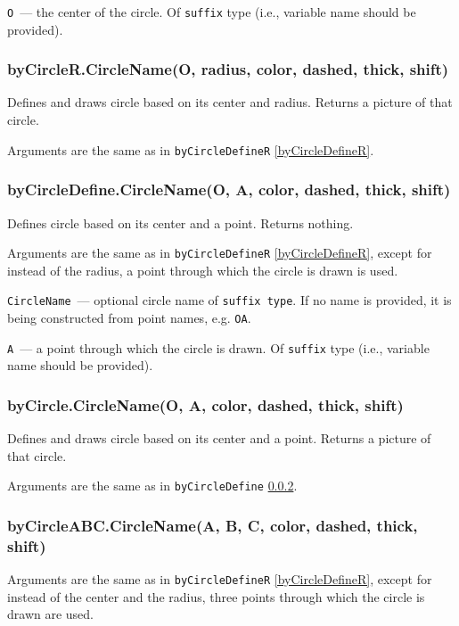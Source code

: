 	\texttt{O}~— the center of the circle. Of \texttt{suffix} type (i.e., variable name should be provided).

\subsubsection{byCircleR.CircleName(O, radius, color, dashed, thick, shift)}\label{byCircleR}
	
	Defines and draws circle based on its center and radius. Returns a picture of that circle.
	
	Arguments are the same as in \texttt{byCircleDefineR} \ref{byCircleDefineR}.

\subsubsection{byCircleDefine.CircleName(O, A, color, dashed, thick, shift)}\label{byCircleDefine}
	
	Defines circle based on its center and a point. Returns nothing.
	
	Arguments are the same as in \texttt{byCircleDefineR} \ref{byCircleDefineR}, except for instead of the radius, a point through which the circle is drawn is used.
	
	\texttt{CircleName}~— optional circle name of \texttt{suffix type}. If no name is provided, it is being constructed from point names, e.g. \texttt{OA}.
	
	\texttt{A}~— a point through which the circle is drawn. Of \texttt{suffix} type (i.e., variable name should be provided).

\subsubsection{byCircle.CircleName(O, A, color, dashed, thick, shift)}\label{byCircle}
	
	Defines and draws circle based on its center and a point. Returns a picture of that circle.
	
	Arguments are the same as in \texttt{byCircleDefine} \ref{byCircleDefine}.

\subsubsection{byCircleABC.CircleName(A, B, C, color, dashed, thick, shift)}\label{byCircleABC}
	
	Arguments are the same as in \texttt{byCircleDefineR} \ref{byCircleDefineR}, except for instead of the center and the radius, three points through which the circle is drawn are used.
	
